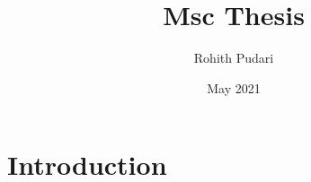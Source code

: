 \documentclass{article}
\title{Msc Thesis}
\author{Rohith Pudari}
\date{May 2021}
\begin{document}
\maketitle

\section{Introduction}
\end{document}
